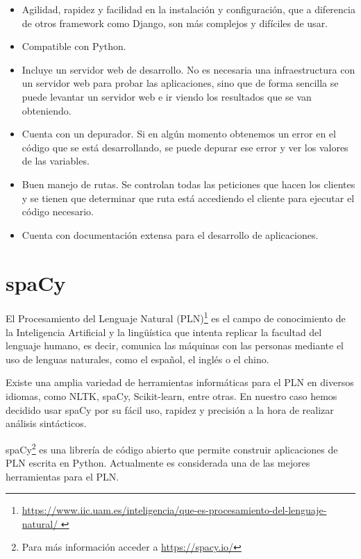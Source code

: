 \begin{itemize}
	\item Agilidad, rapidez y facilidad en la instalación y configuración, que a diferencia de otros framework como Django, son más complejos y difíciles de usar.
	\item Compatible con Python.
	\item Incluye un servidor web de desarrollo. No es necesaria una infraestructura con un servidor web para probar las aplicaciones, sino que de forma sencilla se puede levantar un servidor web e ir viendo los resultados que se van obteniendo.
	\item Cuenta con un depurador. Si en algún momento obtenemos un error en el código que se está desarrollando, se puede depurar ese error y ver los valores de las variables.
	\item Buen manejo de rutas. Se controlan todas las peticiones que hacen los clientes y se tienen que determinar que ruta está accediendo el cliente para ejecutar el código necesario.
	\item Cuenta con documentación extensa para el desarrollo de aplicaciones.
\end{itemize}

%	
%	
%	
%	


\section{spaCy}\label{sec:spacy}

El Procesamiento del Lenguaje Natural (PLN)\footnote{\href{https://www.iic.uam.es/inteligencia/que-es-procesamiento-del-lenguaje-natural/ }{https://www.iic.uam.es/inteligencia/que-es-procesamiento-del-lenguaje-natural/ }} es el campo de conocimiento de la Inteligencia Artificial y la lingüística que intenta replicar la facultad del lenguaje humano, es decir, comunica las máquinas con las personas mediante el uso de lenguas naturales, como el español, el inglés o el chino.

Existe una amplia variedad de herramientas informáticas para el PLN en diversos idiomas, como NLTK, spaCy, Scikit-learn, entre otras. En nuestro caso hemos decidido usar spaCy por su fácil uso, rapidez y precisión a la hora de realizar análisis sintácticos.

spaCy\footnote{Para más información acceder a \href{https://spacy.io/}{https://spacy.io/}} es una librería de código abierto que permite construir aplicaciones de PLN escrita en Python. Actualmente es considerada una de las mejores herramientas para el PLN. 


